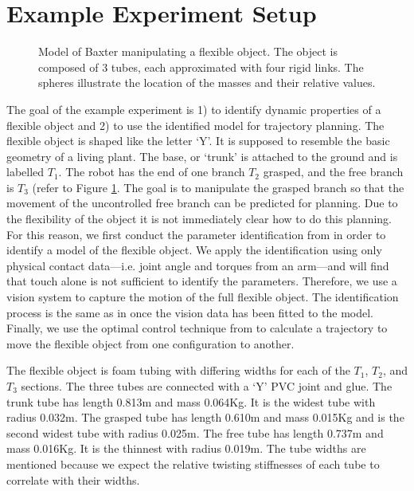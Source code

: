 \documentclass[runningheads,a4paper]{llncs}
\begin{document}
\section{Example Experiment Setup}
\label{sec-exp}
\begin{figure}[!htb]
\centering
\def\svgwidth{.6\textwidth}%

\caption{Model of Baxter manipulating a flexible object. The object is composed of 3 tubes, each approximated with four rigid links. The spheres illustrate the location of the masses and their relative values. }
\label{fig-baxter_y_sim}
\end{figure}

The goal of the example experiment is 1) to identify dynamic properties of a flexible object and 2) to use the identified model for trajectory planning. The flexible object is shaped like the letter `Y'.  It is supposed to resemble the basic geometry of a living plant. The base, or `trunk' is attached to the ground and is labelled $T_1$. The robot has the end of one branch $T_2$ grasped, and the free branch is $T_3$ (refer to Figure \ref{fig-baxter_y_sim}.  The goal is to manipulate the grasped branch so that the movement of the uncontrolled free branch can be predicted for planning.  
Due to the flexibility of the object it is not immediately clear how to do this planning.
For this reason, we first conduct the parameter identification from \cite{caldwell_coleman_correll_iros} in order to identify a model of the flexible object. We apply the identification using only physical contact data---i.e. joint angle and torques from an arm---and will find that touch alone is not sufficient to identify the parameters. Therefore, we use a vision system to capture the motion of the full flexible object. The identification process is the same as in \cite{caldwell_coleman_correll_iros} once the vision data has been fitted to the model.  Finally, we use the optimal control technique from \cite{hauser} to calculate a trajectory to move the flexible object from one configuration to another.

The flexible object is foam tubing with differing widths for each of the $T_1$, $T_2$, and $T_3$ sections. The three tubes are connected with a `Y' PVC joint and glue.  The trunk tube has length 0.813m and mass 0.064Kg. It is the widest tube with radius 0.032m. The grasped tube has length 0.610m and mass 0.015Kg and is the second widest tube with radius 0.025m. The free tube has length 0.737m and mass 0.016Kg. It is the thinnest with radius 0.019m.  The tube widths are mentioned because we expect the relative twisting stiffnesses of each tube to correlate with their widths. 
\end{document}
